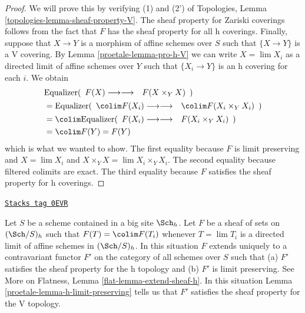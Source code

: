 \begin{proof}

We will prove this by verifying (1) and (2') of
Topologies, Lemma \ref{topologies-lemma-sheaf-property-V}.
The sheaf property for Zariski coverings follows from
the fact that $F$ has the sheaf property for all h coverings.
Finally, suppose that $X \to Y$ is a morphism of affine schemes
over $S$ such that $\{X \to Y\}$ is a V covering.
By Lemma \ref{proetale-lemma-pro-h-V} we can write $X = \lim X_i$
as a directed limit of affine schemes
over $Y$ such that $\{X_i \to Y\}$ is an h covering for each $i$.
We obtain
\begin{align*}
&
\text{Equalizer}(
\begin{array}{cc}F(X) \longrightarrow\longrightarrow & F(X \times_Y X)\end{array}
)
\\
& =
\text{Equalizer}(
\begin{array}{cc}\colim F(X_i) \longrightarrow\longrightarrow & \colim F(X_i \times_Y X_i)\end{array}
)
\\
& =
\colim
\text{Equalizer}(
\begin{array}{cc}F(X_i) \longrightarrow\longrightarrow & F(X_i \times_Y X_i)\end{array}
)
\\
& =
\colim F(Y) = F(Y)
\end{align*}
which is what we wanted to show.
The first equality because $F$ is limit preserving and $X = \lim X_i$ and
$X \times_Y X = \lim X_i \times_Y X_i$.
The second equality because filtered colimits are exact.
The third equality because $F$ satisfies the sheaf property
for h coverings.
\end{proof}

\begin{remark}
\label{proetale-remark-h-limit-preserving}
\href{https://stacks.math.columbia.edu/tag/0EVR}{\texttt{Stacks tag 0EVR}}

Let $S$ be a scheme contained in a big site $\Sch_h$. Let $F$ be a sheaf
of sets on $(\Sch/S)_h$ such that $F(T) = \colim F(T_i)$ whenever
$T = \lim T_i$ is a directed limit of affine schemes in $(\Sch/S)_h$.
In this situation $F$ extends uniquely to a contravariant functor $F'$
on the category of all schemes over $S$ such that (a) $F'$ satisfies the
sheaf property for the h topology and (b) $F'$ is limit preserving.
See More on Flatness, Lemma \ref{flat-lemma-extend-sheaf-h}.
In this situation Lemma \ref{proetale-lemma-h-limit-preserving}
tells us that $F'$ satisfies
the sheaf property for the V topology.
\end{remark}

